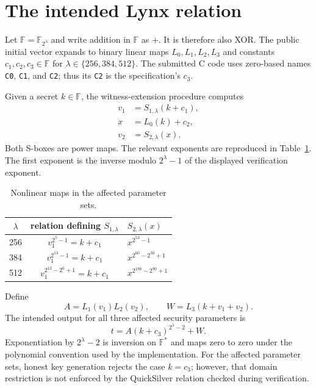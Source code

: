 \documentclass[11pt,a4paper]{article}
\newcommand{\F}{\mathbb{F}}
\begin{document}
\section{The intended Lynx relation}

Let $\F=\F_{2^\lambda}$ and write addition in $\F$ as $+$.  It is therefore also XOR.  The
public initial vector expands to binary linear maps $L_0,L_1,L_2,L_3$ and constants
$c_1,c_2,c_3\in\F$ for $\lambda\in\{256,384,512\}$.  The submitted C code uses zero-based
names \texttt{C0}, \texttt{C1}, and \texttt{C2}; thus its \texttt{C2} is the specification's
$c_3$.

Given a secret $k\in\F$, the witness-extension procedure computes
\begin{align}
  v_1 &= S_{1,\lambda}(k+c_1), \\
  x   &= L_0(k)+c_2, \\
  v_2 &= S_{2,\lambda}(x).
\end{align}
Both S-boxes are power maps.  The relevant exponents are reproduced in
Table~\ref{tab:sboxes}.  The first exponent is the inverse modulo $2^\lambda-1$ of the
displayed verification exponent.

\begin{table}[h]
\centering
\caption{Nonlinear maps in the affected parameter sets.}
\label{tab:sboxes}
\begin{tabular}{ccl}
\toprule
$\lambda$ & relation defining $S_{1,\lambda}$ & $S_{2,\lambda}(x)$ \\
\midrule
256 & $v_1^{2^5-1}=k+c_1$ & $x^{2^{53}-1}$ \\
384 & $v_1^{2^{13}-1}=k+c_1$ & $x^{2^{60}-2^{30}+1}$ \\
512 & $v_1^{2^{12}-2^6+1}=k+c_1$ & $x^{2^{180}-2^{90}+1}$ \\
\bottomrule
\end{tabular}
\end{table}

Define
\[
  A=L_1(v_1)L_2(v_2),\qquad
  W=L_3(k+v_1+v_2).
\]
The intended output for all three affected security parameters is
\begin{equation}
  t=A(k+c_3)^{2^\lambda-2}+W.
  \label{eq:intended-output}
\end{equation}
Exponentiation by $2^\lambda-2$ is inversion on $\F^*$ and maps zero to zero under the
polynomial convention used by the implementation.  For the affected parameter sets, honest
key generation rejects the case $k=c_3$; however, that domain restriction is not enforced by
the QuickSilver relation checked during verification.
\end{document}
